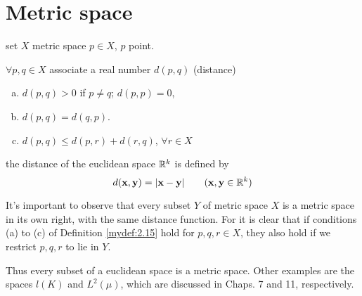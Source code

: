 \section{Metric space}
\begin{mydef}\label{mydef:2.15}
    set $X$ metric space $p\in X$, $p$ point.

    $\forall p,q \in X$ associate a real number $d(p,q)$ (distance)
    \begin{enumerate}[a.]
        \item $d(p,q) > 0$ if $p \neq q$; $d(p,p)=0$,
        \item $d(p,q) = d(q,p)$.
        \item $d(p,q) \leq d(p,r) + d(r,q)$, $\forall r\in X$
    \end{enumerate}
\end{mydef}

\begin{myExample}
    the distance of the euclidean space ${\protect\mathbb R}^k$ is defined by
    \begin{equation}\label{eq:2.19}
        d(\mathbf{x}, \mathbf{y}) = |\mathbf{x} - \mathbf{y}|
        \qquad (\mathbf{x}, \mathbf{y}\in {\protect\mathbb R}^k)
    \end{equation}
\end{myExample}

It's important to observe that every subset $Y$ of metric space $X$ is a metric space in its own right, with the same distance function. For it is clear that if conditions (a) to (c) of Definition \ref{mydef:2.15} hold for $p, q, r \in X$, they also hold if we restrict $p, q, r$ to lie in $Y$.

Thus every subset of a euclidean space is a metric space. Other examples
are the spaces $l(K)$ and $L^2 (\mu)$, 
which are discussed in Chaps. 7 and 11, respectively.



